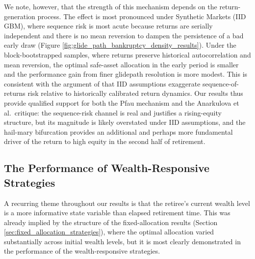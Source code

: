 \documentclass[11pt]{article}
\begin{document}
We note, however, that the strength of this mechanism depends on the return-generation process. The effect is most pronounced under Synthetic Markets (IID GBM), where sequence risk is most acute because returns are serially independent and there is no mean reversion to dampen the persistence of a bad early draw (Figure \ref{fig:glide_path_bankruptcy_density_results}). Under the block-bootstrapped samples, where returns preserve historical autocorrelation and mean reversion, the optimal safe-asset allocation in the early period is smaller and the performance gain from finer glidepath resolution is more modest. This is consistent with the argument of \textcite{anarkulova2025beyond} that IID assumptions exaggerate sequence-of-returns risk relative to historically calibrated return dynamics. Our results thus provide qualified support for both the Pfau mechanism and the Anarkulova et al.\ critique: the sequence-risk channel is real and justifies a rising-equity structure, but its magnitude is likely overstated under IID assumptions, and the hail-mary bifurcation provides an additional and perhaps more fundamental driver of the return to high equity in the second half of retirement.



\subsection{The Performance of Wealth-Responsive Strategies}

A recurring theme throughout our results is that the retiree's current wealth level is a more informative state variable than elapsed retirement time. This was already implied by the structure of the fixed-allocation results (Section \ref{sec:fixed_allocation_strategies}), where the optimal allocation varied substantially across initial wealth levels, but it is most clearly demonstrated in the performance of the wealth-responsive strategies.
\end{document}
